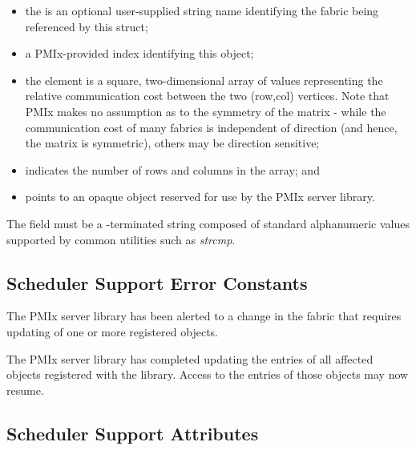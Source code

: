\begin{itemize}
    \item the  is an optional user-supplied string name identifying the fabric being referenced by this struct;
    \item a \ac{PMIx}-provided index identifying this object;
    \item the  element is a square, two-dimensional array of  values representing the relative communication cost between the two (row,col) vertices. Note that \ac{PMIx} makes no assumption as to the symmetry of the matrix - while the communication cost of many fabrics is independent of direction (and hence, the  matrix is symmetric), others may be direction sensitive;
    \item {} indicates the number of rows and columns in the  array; and
    \item {} points to an opaque object reserved for use by the \ac{PMIx} server library.
\end{itemize}

The  field must be a -terminated string composed of standard alphanumeric values supported by common utilities such as \textit{strcmp}.


\subsection{Scheduler Support Error Constants}
\label{api:sched:errors}

\begin{constantdesc}

%
The \ac{PMIx} server library has been alerted to a change in the fabric that requires updating of one or more registered  objects.

%
The \ac{PMIx} server library has completed updating the entries of all affected  objects registered with the library. Access to the entries of those objects may now resume.

\end{constantdesc}


\subsection{Scheduler Support Attributes}
\label{api:sched:attrs}

